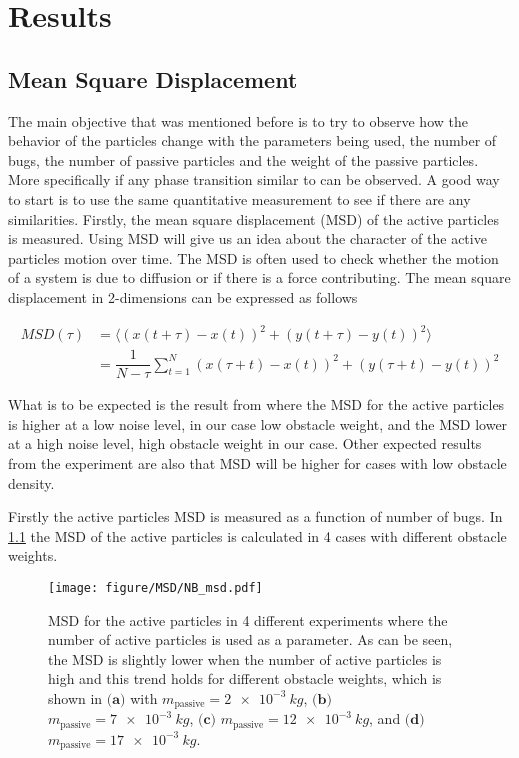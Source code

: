 \chapter{Results}
\section{Mean Square Displacement}

The main objective that was mentioned before is to try to observe how 
the behavior of the particles change with the parameters being used, 
the number of bugs, the number of passive particles and the weight of the passive particles. 
More specifically if any phase transition similar to \cite{nilsson2017metastable} can be observed.
A good way to start is to use the same quantitative measurement to see if there are any similarities.
Firstly, the mean square displacement (MSD) of the active particles is measured. Using MSD 
will give us an idea about the character of the active particles motion over time. 
The MSD is often used to check whether the motion of a system is due to diffusion or if there is 
a force contributing. The mean square displacement in 2-dimensions can be expressed as follows

\begin{align}
	MSD(\tau)   &=  \langle (x(t+\tau)-x(t))^2 + (y(t+\tau)-y(t))^2\rangle \label{eqn:2dim_msd}\\
		    &=  \dfrac{1}{N-\tau}\sum_{t=1}^{N}\left( x(\tau+t)-x(t)\right)^2 + \left( y(\tau+t)-y(t)\right)^2
\end{align}

What is to be expected is the result from \cite{nilsson2017metastable}
where the MSD for the active particles is higher at a low noise level, in our case 
low obstacle weight, and the MSD lower at a high noise level, high obstacle weight in our case. 
Other expected results from the experiment are also that MSD will be higher for cases with low obstacle density.

Firstly the active particles MSD is measured as a function of number of bugs.
In \cref{fig:msd_NB} the MSD of the active particles is calculated in 4 cases with 
different obstacle weights. 

\begin{figure}[htbp]
    \centering
    \texttt{[image: figure/MSD/NB\_msd.pdf]}
    \caption{MSD for the active particles in 4 different experiments where the number of 
    active particles is used as a parameter. As can be seen, the MSD is slightly lower when the number
    of active particles is high and this trend holds for different obstacle weights, 
    which is shown in $\textbf{(a)}$ with $m_{\text{passive}}=\SI{2e-3}{kg}$, 
    $\textbf{(b)}$ $m_{\text{passive}}=\SI{7e-3}{kg}$, 
    $\textbf{(c)}$ $m_{\text{passive}}=\SI{12e-3}{kg}$, 
    and $\textbf{(d)}$ $m_{\text{passive}}=\SI{17e-3}{kg}$.} 
    \label{fig:msd_NB}
\end{figure}

